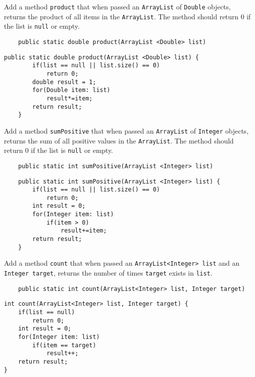 \begin{questions}
\question Add a method \texttt{product} that when passed an \texttt{ArrayList} of \texttt{Double} objects, returns the product of all items in the \texttt{ArrayList}. The method should return 0 if the list is \texttt{null} or empty.

\begin{lstlisting}
	public static double product(ArrayList <Double> list)
\end{lstlisting}

\begin{solution}
\begin{lstlisting}
public static double product(ArrayList <Double> list) {
		if(list == null || list.size() == 0) 
			return 0;
		double result = 1;
		for(Double item: list)
			result*=item;
		return result;
	}	
\end{lstlisting}	
\end{solution}


\question Add a method \texttt{sumPositive} that when passed an \texttt{ArrayList} of \texttt{Integer} objects, returns the sum of all positive values in the \texttt{ArrayList}. The method should return 0 if the list is \texttt{null} or empty.

\begin{lstlisting}
	public static int sumPositive(ArrayList <Integer> list)
\end{lstlisting}

\begin{solution}
\begin{lstlisting}
	public static int sumPositive(ArrayList <Integer> list) {
		if(list == null || list.size() == 0) 
			return 0;
		int result = 0;
		for(Integer item: list)
			if(item > 0)			
				result+=item;
		return result;
	}	
\end{lstlisting}	
\end{solution}

\question Add a method \texttt{count} that when passed an \texttt{ArrayList<Integer> list} and an \texttt{Integer target}, returns the number of times \texttt{target} exists in \texttt{list}.

\begin{lstlisting}
	public static int count(ArrayList<Integer> list, Integer target)
\end{lstlisting}

\begin{solution}
\begin{lstlisting}
int count(ArrayList<Integer> list, Integer target) {
	if(list == null)
		return 0;
	int result = 0;
	for(Integer item: list)
		if(item == target)
			result++;
	return result;
}
\end{lstlisting}
\end{solution}


\end{questions}
